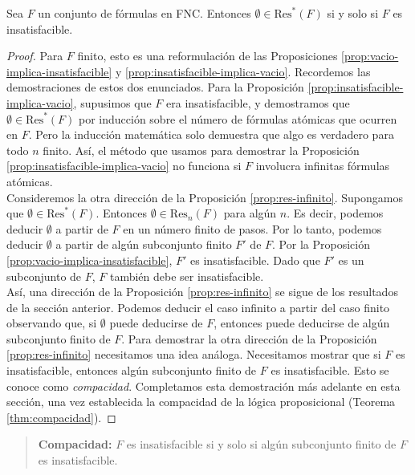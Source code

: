 \message{ !name(main.tex)}\documentclass[12pt,a4paper]{book}
\begin{document}
    \begin{proposicion}\label{prop:res-infinito}
        Sea $F$ un conjunto de fórmulas en FNC. Entonces $\emptyset\in\mathrm{Res}^{*}(F)$ si y solo si $F$ es
        insatisfacible.
    \end{proposicion}
    \begin{proof}
        Para $F$ finito, esto es una reformulación de las Proposiciones \ref{prop:vacio-implica-insatisfacible} y
        \ref{prop:insatisfacible-implica-vacio}. Recordemos las demostraciones de estos dos enunciados. Para la Proposición
        \ref{prop:insatisfacible-implica-vacio}, supusimos que $F$ era insatisfacible, y demostramos que
        $\emptyset\in\mathrm{Res}^{*}(F)$ por inducción sobre el número de fórmulas atómicas que ocurren en $F$. Pero la
        inducción matemática solo demuestra que algo es verdadero para todo $n$ finito. Así, el método que usamos para
        demostrar la Proposición \ref{prop:insatisfacible-implica-vacio} no funciona si $F$ involucra infinitas fórmulas
        atómicas.\\
        Consideremos la otra dirección de la Proposición \ref{prop:res-infinito}. Supongamos que
        $\emptyset\in\mathrm{Res}^{*}(F)$. Entonces $\emptyset\in\mathrm{Res}_{n}(F)$ para algún $n$. Es decir, podemos
        deducir $\emptyset$ a partir de $F$ en un número finito de pasos. Por lo tanto, podemos deducir $\emptyset$ a partir
        de algún subconjunto finito $F'$ de $F$. Por la Proposición \ref{prop:vacio-implica-insatisfacible}, $F'$ es
        insatisfacible. Dado que $F'$ es un subconjunto de $F$, $F$ también debe ser insatisfacible.\\
        Así, una dirección de la Proposición \ref{prop:res-infinito} se sigue de los resultados de la sección anterior.
        Podemos deducir el caso infinito a partir del caso finito observando que, si $\emptyset$ puede deducirse de $F$,
        entonces puede deducirse de algún subconjunto finito de $F$. Para demostrar la otra dirección de la Proposición
        \ref{prop:res-infinito} necesitamos una idea análoga. Necesitamos mostrar que si $F$ es insatisfacible, entonces
        algún subconjunto finito de $F$ es insatisfacible. Esto se conoce como \textit{compacidad}. Completamos esta
        demostración más adelante en esta sección, una vez establecida la compacidad de la lógica proposicional (Teorema
        \ref{thm:compacidad}).
    \end{proof}

    \begin{quote}
        \textbf{Compacidad:} $F$ es insatisfacible si y solo si algún subconjunto finito de $F$ es insatisfacible.
    \end{quote}
\end{document}
